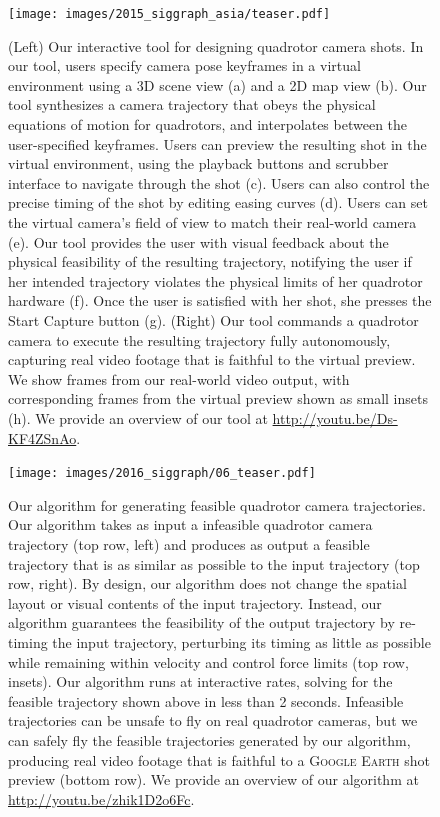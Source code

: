 \begin{figure}[t!]
\centering
\texttt{[image: images/2015\_siggraph\_asia/teaser.pdf]}
\caption{
(Left) Our interactive tool for designing quadrotor camera shots.
In our tool, users specify camera pose keyframes in a virtual environment using a 3D scene view (a) and a 2D map view (b).
Our tool synthesizes a camera trajectory that obeys the physical equations of motion for quadrotors, and interpolates between the user-specified keyframes.
Users can preview the resulting shot in the virtual environment, using the playback buttons and scrubber interface to navigate through the shot (c).
Users can also control the precise timing of the shot by editing easing curves (d).
Users can set the virtual camera's field of view to match their real-world camera (e).
Our tool provides the user with visual feedback about the physical feasibility of the resulting trajectory, notifying the user if her intended trajectory violates the physical limits of her quadrotor hardware (f).
Once the user is satisfied with her shot, she presses the Start Capture button (g).
(Right) Our tool commands a quadrotor camera to execute the resulting trajectory fully autonomously, capturing real video footage that is faithful to the virtual preview.
We show frames from our real-world video output, with corresponding frames from the virtual preview shown as small insets (h).
We provide an overview of our tool at \url{http://youtu.be/Ds-KF4ZSnAo}.
}
\label{fig:ch1:teaser_ch2}
\end{figure}

\begin{figure}[t!]
\centering
\texttt{[image: images/2016\_siggraph/06\_teaser.pdf]}
\caption{
Our algorithm for generating feasible quadrotor camera trajectories.
Our algorithm takes as input a infeasible quadrotor camera trajectory (top row, left) and produces as output a feasible trajectory that is as similar as possible to the input trajectory (top row, right).
By design, our algorithm does not change the spatial layout or  visual contents of the input trajectory.
Instead, our algorithm guarantees the feasibility of the output trajectory by re-timing the input trajectory, perturbing its timing as little as possible while remaining within velocity and control force limits (top row, insets).
Our algorithm runs at interactive rates, solving for the feasible trajectory shown above in less than 2 seconds.
Infeasible trajectories can be unsafe to fly on real quadrotor cameras, but we can safely fly the feasible trajectories generated by our algorithm, producing real video footage that is faithful to a \textsc{Google Earth} shot preview (bottom row).
We provide an overview of our algorithm at \url{http://youtu.be/zhik1D2o6Fc}.
}
\label{fig:ch1:teaser_ch3}
\end{figure}


